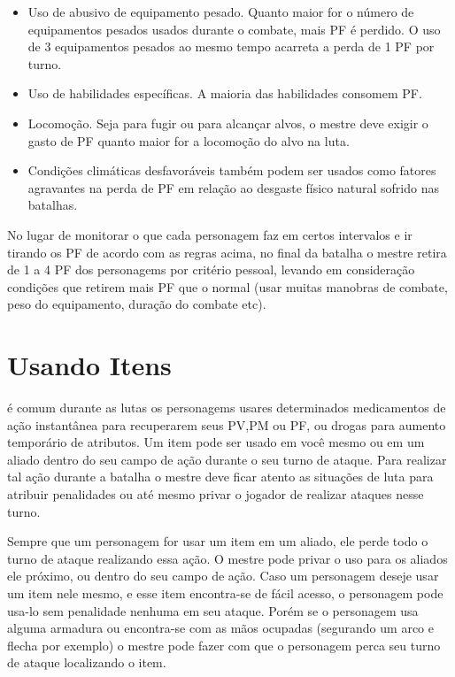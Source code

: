 \begin{itemize}

	\item Uso de abusivo de equipamento pesado. Quanto maior for o número de equipamentos pesados usados durante o combate, mais PF é perdido. O uso de 3 equipamentos pesados ao  mesmo tempo acarreta a perda de 1 PF por turno. 
	\item Uso de habilidades específicas. A maioria das habilidades consomem PF.

	\item Locomoção. Seja para fugir ou para alcançar alvos, o mestre deve exigir o gasto de PF quanto maior for a locomoção do alvo na luta.

	\item Condições climáticas desfavoráveis também podem ser usados como fatores agravantes na perda de PF em relação ao desgaste físico natural sofrido nas batalhas.
\end{itemize}

No lugar de monitorar o que cada personagem faz em certos intervalos e ir tirando os PF de acordo com as regras acima, no final da batalha o mestre retira de 1 a 4 PF dos personagems por critério pessoal, levando em consideração condições que retirem mais PF que o normal (usar muitas manobras de combate, peso do equipamento, duração do combate etc).


\section{Usando Itens}

é comum durante as lutas os personagems usares determinados medicamentos de ação instantânea para recuperarem seus PV,PM ou PF, ou drogas para aumento temporário de atributos. Um item pode ser usado em você mesmo ou em um aliado dentro do seu campo de ação durante o seu turno de ataque. Para realizar tal ação durante a batalha o mestre deve ficar atento as situações de luta para atribuir penalidades ou até mesmo privar o jogador de realizar ataques nesse turno. 

Sempre que um personagem for usar um item em um aliado, ele perde todo o turno de ataque realizando essa ação. O mestre pode privar o uso para os aliados ele próximo, ou dentro do seu campo de ação. Caso um personagem deseje usar um item nele mesmo, e esse item encontra-se de fácil acesso, o personagem pode usa-lo sem penalidade nenhuma em seu ataque. Porém se o personagem usa alguma armadura ou encontra-se com as mãos ocupadas (segurando um arco e flecha por exemplo) o mestre pode fazer com que o personagem perca seu turno de ataque localizando o item.


